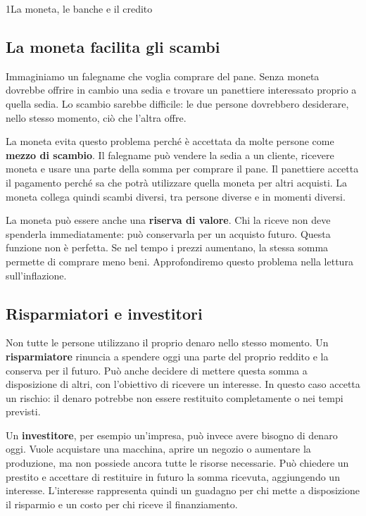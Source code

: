 \clearpage{}


\begin{lettura}{1}{La moneta, le banche e il credito}


\subsection*{La moneta facilita gli scambi}
Immaginiamo un falegname che voglia comprare del pane. Senza moneta dovrebbe offrire in cambio una sedia e trovare un panettiere interessato proprio a quella sedia. Lo scambio sarebbe difficile: le due persone dovrebbero desiderare, nello stesso momento, ciò che l'altra offre.

La moneta evita questo problema perché è accettata da molte persone come \textbf{mezzo di scambio}. Il falegname può vendere la sedia a un cliente, ricevere moneta e usare una parte della somma per comprare il pane. Il panettiere accetta il pagamento perché sa che potrà utilizzare quella moneta per altri acquisti. La moneta collega quindi scambi diversi, tra persone diverse e in momenti diversi.

La moneta può essere anche una \textbf{riserva di valore}. Chi la riceve non deve spenderla immediatamente: può conservarla per un acquisto futuro. Questa funzione non è perfetta. Se nel tempo i prezzi aumentano, la stessa somma permette di comprare meno beni. Approfondiremo questo problema nella lettura sull'inflazione.

\subsection*{Risparmiatori e investitori}
Non tutte le persone utilizzano il proprio denaro nello stesso momento. Un \textbf{risparmiatore} rinuncia a spendere oggi una parte del proprio reddito e la conserva per il futuro. Può anche decidere di mettere questa somma a disposizione di altri, con l'obiettivo di ricevere un interesse. In questo caso accetta un rischio: il denaro potrebbe non essere restituito completamente o nei tempi previsti.

Un \textbf{investitore}, per esempio un'impresa, può invece avere bisogno di denaro oggi. Vuole acquistare una macchina, aprire un negozio o aumentare la produzione, ma non possiede ancora tutte le risorse necessarie. Può chiedere un prestito e accettare di restituire in futuro la somma ricevuta, aggiungendo un interesse. L'interesse rappresenta quindi un guadagno per chi mette a disposizione il risparmio e un costo per chi riceve il finanziamento.


\end{lettura}
